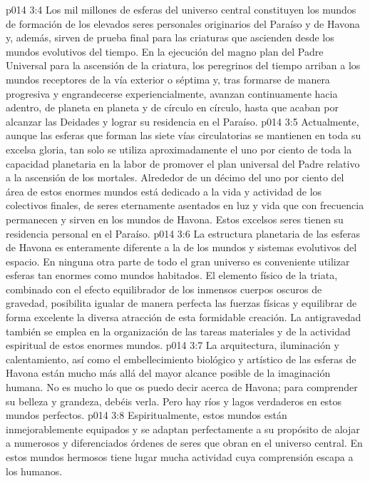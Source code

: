 \vs p014 3:4 Los mil millones de esferas del universo central constituyen los mundos de formación de los elevados seres personales originarios del Paraíso y de Havona y, además, sirven de prueba final para las criaturas que ascienden desde los mundos evolutivos del tiempo. En la ejecución del magno plan del Padre Universal para la ascensión de la criatura, los peregrinos del tiempo arriban a los mundos receptores de la vía exterior o séptima y, tras formarse de manera progresiva y engrandecerse experiencialmente, avanzan continuamente hacia adentro, de planeta en planeta y de círculo en círculo, hasta que acaban por alcanzar las Deidades y lograr su residencia en el Paraíso.
\vs p014 3:5 Actualmente, aunque las esferas que forman las siete vías circulatorias se mantienen en toda su excelsa gloria, tan solo se utiliza aproximadamente el uno por ciento de toda la capacidad planetaria en la labor de promover el plan universal del Padre relativo a la ascensión de los mortales. Alrededor de un décimo del uno por ciento del área de estos enormes mundos está dedicado a la vida y actividad de los colectivos finales, de seres eternamente asentados en luz y vida que con frecuencia permanecen y sirven en los mundos de Havona. Estos excelsos seres tienen su residencia personal en el Paraíso.
\vs p014 3:6 La estructura planetaria de las esferas de Havona es enteramente diferente a la de los mundos y sistemas evolutivos del espacio. En ninguna otra parte de todo el gran universo es conveniente utilizar esferas tan enormes como mundos habitados. El elemento físico de la triata, combinado con el efecto equilibrador de los inmensos cuerpos oscuros de gravedad, posibilita igualar de manera perfecta las fuerzas físicas y equilibrar de forma excelente la diversa atracción de esta formidable creación. La antigravedad también se emplea en la organización de las tareas materiales y de la actividad espiritual de estos enormes mundos.
\vs p014 3:7 La arquitectura, iluminación y calentamiento, así como el embellecimiento biológico y artístico de las esferas de Havona están mucho más allá del mayor alcance posible de la imaginación humana. No es mucho lo que os puedo decir acerca de Havona; para comprender su belleza y grandeza, debéis verla. Pero hay ríos y lagos verdaderos en estos mundos perfectos.
\vs p014 3:8 Espiritualmente, estos mundos están inmejorablemente equipados y se adaptan perfectamente a su propósito de alojar a numerosos y diferenciados órdenes de seres que obran en el universo central. En estos mundos hermosos tiene lugar mucha actividad cuya comprensión escapa a los humanos.
